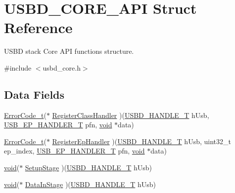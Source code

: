 \hypertarget{structUSBD__CORE__API}{\section{U\-S\-B\-D\-\_\-\-C\-O\-R\-E\-\_\-\-A\-P\-I Struct Reference}
\label{structUSBD__CORE__API}
}


U\-S\-B\-D stack Core A\-P\-I functions structure.  




{\ttfamily \#include $<$usbd\-\_\-core.\-h$>$}

\subsection*{Data Fields}
\begin{DoxyCompactItemize}
\item 
\hyperlink{error_8h_a905255056c349318139d94aa4523d516}{Error\-Code\-\_\-t}($\ast$ \hyperlink{structUSBD__CORE__API_abae19ffbccf70d251c1bdc64aefa3bc7}{Register\-Class\-Handler} )(\hyperlink{group__USBD__Core_gafdbb2204d929cb9d75736bd2b42342ac}{U\-S\-B\-D\-\_\-\-H\-A\-N\-D\-L\-E\-\_\-\-T} h\-Usb, \hyperlink{group__USBD__Core_gaa578d29a85226108ef62c6d5c325b742}{U\-S\-B\-\_\-\-E\-P\-\_\-\-H\-A\-N\-D\-L\-E\-R\-\_\-\-T} pfn, \hyperlink{Paradigm_2Tern__EE_2small_2portmacro_8h_a14d32f8130d3c0b212cfc751730b5b49}{void} $\ast$data)
\item 
\hyperlink{error_8h_a905255056c349318139d94aa4523d516}{Error\-Code\-\_\-t}($\ast$ \hyperlink{structUSBD__CORE__API_aae115addea44c865ee6e474740a9cf80}{Register\-Ep\-Handler} )(\hyperlink{group__USBD__Core_gafdbb2204d929cb9d75736bd2b42342ac}{U\-S\-B\-D\-\_\-\-H\-A\-N\-D\-L\-E\-\_\-\-T} h\-Usb, uint32\-\_\-t ep\-\_\-index, \hyperlink{group__USBD__Core_gaa578d29a85226108ef62c6d5c325b742}{U\-S\-B\-\_\-\-E\-P\-\_\-\-H\-A\-N\-D\-L\-E\-R\-\_\-\-T} pfn, \hyperlink{Paradigm_2Tern__EE_2small_2portmacro_8h_a14d32f8130d3c0b212cfc751730b5b49}{void} $\ast$data)
\item 
\hyperlink{Paradigm_2Tern__EE_2small_2portmacro_8h_a14d32f8130d3c0b212cfc751730b5b49}{void}($\ast$ \hyperlink{structUSBD__CORE__API_abf9196752dcf110a13c44a14b368e4be}{Setup\-Stage} )(\hyperlink{group__USBD__Core_gafdbb2204d929cb9d75736bd2b42342ac}{U\-S\-B\-D\-\_\-\-H\-A\-N\-D\-L\-E\-\_\-\-T} h\-Usb)
\item 
\hyperlink{Paradigm_2Tern__EE_2small_2portmacro_8h_a14d32f8130d3c0b212cfc751730b5b49}{void}($\ast$ \hyperlink{structUSBD__CORE__API_abe1068288a0eb073f7c9eee1466d4fae}{Data\-In\-Stage} )(\hyperlink{group__USBD__Core_gafdbb2204d929cb9d75736bd2b42342ac}{U\-S\-B\-D\-\_\-\-H\-A\-N\-D\-L\-E\-\_\-\-T} h\-Usb)

\end{DoxyCompactItemize}
